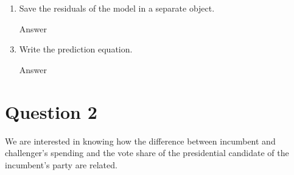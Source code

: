 \documentclass[12pt,letterpaper]{article}
\begin{document}
\begin{enumerate}
		\vspace{7cm}
		\item Save the residuals of the model in a separate object.	
		\item [Answer]
		 
		\vspace{7cm}
		\item Write the prediction equation.
		\item [Answer]
		 
	\end{enumerate}
	
\newpage

\section*{Question 2}
\noindent We are interested in knowing how the difference between incumbent and challenger's spending and the vote share of the presidential candidate of the incumbent's party are related.	\vspace{.25cm}
\end{document}
